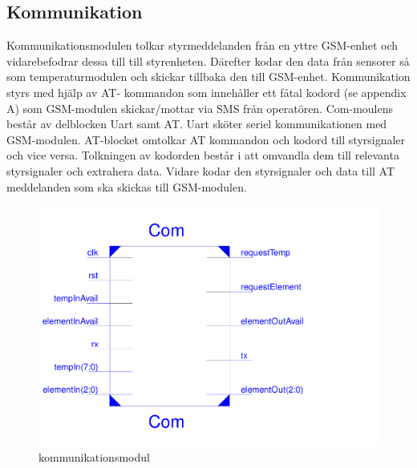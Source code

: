 \documentclass[a4paper]{scrartcl}
\begin{document}
	\subsection{Kommunikation}
		Kommunikationsmodulen tolkar styrmeddelanden från en yttre GSM-enhet och vidarebefodrar  dessa till till styrenheten. Därefter kodar den data från sensorer så som temperaturmodulen och skickar tillbaka den till GSM-enhet. Kommunikation styrs med hjälp 			av AT-	kommandon som innehåller ett fåtal kodord (se appendix A) som GSM-modulen skickar/mottar  via SMS från operatören. 
		Com-moulens består av delblocken Uart samt AT. Uart sköter seriel kommunikationen med GSM-modulen. AT-blocket omtolkar AT kommandon och kodord till styrsignaler och vice versa. 
		Tolkningen av kodorden består i att omvandla dem till relevanta styrsignaler och extrahera data. Vidare kodar den styrsignaler och data till AT meddelanden som ska skickas till GSM-modulen.
			\begin{figure}[H]
				\centering
				\includegraphics[scale=0.3]{comschematic.pdf}
				\caption{kommunikationsmodul}
			\end{figure}
\end{document}
